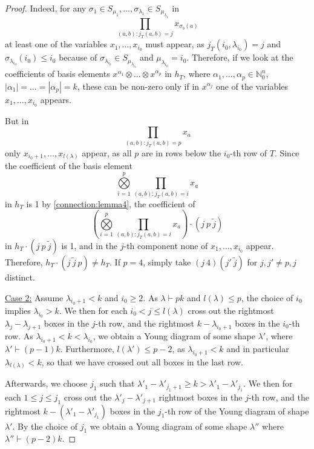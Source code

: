 \documentclass[a4paper]{amsart}
\def\N{{\mathbb{N}}}
\newcommand{\abs}[1]{\left| #1\right|}
\begin{document}
\begin{proof}
	Indeed, for any $\sigma_1\in S_{\mu_1}, \ldots, \sigma_{\lambda_1}\in S_{\mu_{\lambda_1}}$ in
	\begin{displaymath}
		\prod\limits_{(a,b):j_T(a,b)=j}x_{\sigma_b(a)}
	\end{displaymath}
	at least one of the variables $x_1,\ldots,x_{i_0}$ must appear, as $j_T(i_0,\lambda_{i_0})=j$ and $\sigma_{\lambda_{i_0}}(i_0)\leq i_0$ because of $\sigma_{\lambda_{i_0}}\in S_{\mu_{\lambda_{i_0}}}$ and $\mu_{\lambda_{i_0}}=i_0$.
	Therefore,
	if we look at the coefficients of basis elements $x^{\alpha_1}\otimes\ldots\otimes x^{\alpha_p}$ in $h_T$, where $\alpha_1,\ldots,\alpha_p\in\N_0^n$, $\abs{\alpha_1}=\ldots=\abs{\alpha_p}=k$,
	these can be non-zero only if in $x^{\alpha_j}$ one of the variables $x_1,\ldots,x_{i_0}$ appears.
	
	But in
	\begin{displaymath}
		\prod\limits_{(a,b):j_T(a,b)=p}x_a
	\end{displaymath}
	only $x_{i_0+1},\ldots,x_{l(\lambda)}$ appear, as all $p$ are in rows below the $i_0$-th row of $T$.
	Since the coefficient of the basis element
	\begin{displaymath}
		\bigotimes\limits_{i=1}^p\prod\limits_{(a,b):j_T(a,b)=i}x_{a}
	\end{displaymath}
	in $h_T$ is 1 by \cref{connection:lemma4},
	the coefficient of
	\begin{displaymath}
		\left(\bigotimes\limits_{i=1}^p\prod\limits_{(a,b):j_T(a,b)=i}x_{a}\right)\cdot (j\ p\  \tilde j)
	\end{displaymath}
	in $h_T\cdot (j\ p\ \tilde j)$  is 1,
	and in the $j$-th component none of $x_1,\ldots,x_{i_0}$ appear.
	Therefore, $h_T\cdot (j\ \tilde j\ p)\neq h_T$.
	If $p=4$, simply take $(j\ 4)(j'\ \tilde j)$ for $j,j'\neq p,j$ distinct.
	
	\underline{Case 2:} Assume $\lambda_{i_0+1}<k$ and $i_0\geq 2$.
	As $\lambda\vdash pk$ and $l(\lambda)\leq p$,
	the choice of $i_0$ implies $\lambda_{i_0}>k$.
	We then for each $i_0<j\leq l(\lambda)$ cross out the rightmost $\lambda_{j}-\lambda_{j+1}$ boxes in the $j$-th row,
	and the rightmost $k-\lambda_{i_0+1}$ boxes in the $i_0$-th row.
	As $\lambda_{i_0+1}<k<\lambda_{i_0}$,
	we obtain a Young diagram of some shape $\lambda'$, where $\lambda'\vdash (p-1)k$.
	Furthermore, $l(\lambda')\leq p-2$, as $\lambda_{i_0+1}<k$ and in particular $\lambda_{l(\lambda)}<k$, so that we have crossed out all boxes in the last row.

	Afterwards, we choose $j_1$ such that $\lambda'{}_1-\lambda'{}_{j_1+1}\geq k>\lambda'{}_1-\lambda'{}_{j_1}$.
	We then for each $1\leq j\leq j_1$ cross out the $\lambda'{}_j-\lambda'{}_{j+1}$ rightmost boxes in the $j$-th row,
	and the rightmost $k-(\lambda'{}_1-\lambda'{}_{j_1})$ boxes in the $j_1$-th row of the Young diagram of shape $\lambda'$.
	By the choice of $j_1$ we obtain a Young diagram of some shape $\lambda''$ where $\lambda''\vdash (p-2)k$.


\end{proof}
\end{document}
